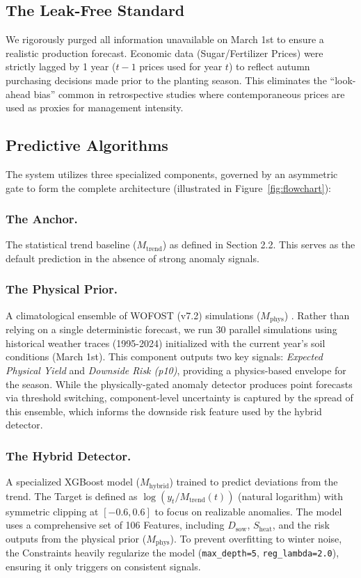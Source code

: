 \subsection{The Leak-Free Standard}
We rigorously purged all information unavailable on March 1st to ensure a realistic production forecast. Economic data (Sugar/Fertilizer Prices) were strictly lagged by 1 year ($t-1$ prices used for year $t$) to reflect autumn purchasing decisions made prior to the planting season. This eliminates the ``look-ahead bias'' common in retrospective studies where contemporaneous prices are used as proxies for management intensity.

\subsection{Predictive Algorithms}
The system utilizes three specialized components, governed by an asymmetric gate to form the complete architecture (illustrated in Figure~\ref{fig:flowchart}):

\subsubsection{The Anchor.}
The statistical trend baseline ($M_{\text{trend}}$) as defined in Section 2.2. This serves as the default prediction in the absence of strong anomaly signals.

\subsubsection{The Physical Prior.}
A climatological ensemble of WOFOST (v7.2) simulations ($M_{\text{phys}}$) \cite{boogaard1998wofost}. Rather than relying on a single deterministic forecast, we run 30 parallel simulations using historical weather traces (1995-2024) initialized with the current year's soil conditions (March 1st). This component outputs two key signals: \textit{Expected Physical Yield} and \textit{Downside Risk (p10)}, providing a physics-based envelope for the season. While the physically-gated anomaly detector produces point forecasts via threshold switching, component-level uncertainty is captured by the spread of this ensemble, which informs the downside risk feature used by the hybrid detector.

\subsubsection{The Hybrid Detector.}
A specialized XGBoost model ($M_{\text{hybrid}}$) \cite{chen2016xgboost,friedman2001greedy} trained to predict deviations from the trend. The Target is defined as $\log(y_t / M_{\text{trend}}(t))$ (natural logarithm) with symmetric clipping at $[-0.6, 0.6]$ to focus on realizable anomalies. The model uses a comprehensive set of 106 {Features}, including $D_{\text{sow}}$, $S_{\text{heat}}$, and the risk outputs from the physical prior ($M_{\text{phys}}$). To prevent overfitting to winter noise, the {Constraints} heavily regularize the model (\texttt{max\_depth=5}, \texttt{reg\_lambda=2.0}), ensuring it only triggers on consistent signals.

